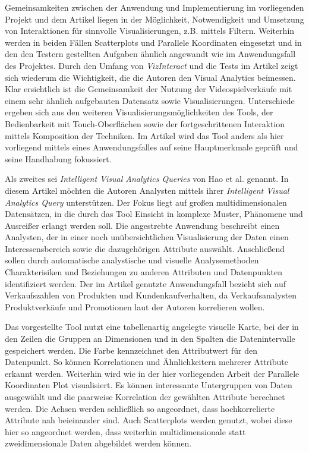 \documentclass[usegeometry=true]{scrartcl}
\begin{document}
Gemeinsamkeiten zwischen der Anwendung und Implementierung im vorliegenden Projekt und dem Artikel liegen in der Möglichkeit, Notwendigkeit und Umsetzung von Interaktionen für sinnvolle Visualisierungen, z.B. mittels Filtern.
Weiterhin werden in beiden Fällen Scatterplots und Parallele Koordinaten eingesetzt und in den den Testern gestellten Aufgaben ähnlich angewandt wie im Anwendungsfall des Projektes. 
Durch den Umfang von \textit{VizInteract} und die Tests im Artikel zeigt sich wiederum die Wichtigkeit, die die Autoren den Visual Analytics beimessen.
Klar ersichtlich ist die Gemeinsamkeit der Nutzung der Videospielverkäufe mit einem sehr ähnlich aufgebauten Datensatz sowie Visualisierungen.
Unterschiede ergeben sich aus den weiteren Visualisierungsmöglichkeiten des Tools, der Bedienbarkeit mit Touch-Oberflächen sowie der fortgeschrittenen Interaktion mittels Komposition der Techniken. 
Im Artikel wird das Tool anders als hier vorliegend mittels eines Anwendungsfalles auf seine Hauptmerkmale geprüft und seine Handhabung fokussiert.

Als zweites sei \textit{Intelligent Visual Analytics Queries} von Hao et al. genannt.\cite{Hao.2007}
In diesem Artikel möchten die Autoren Analysten mittels ihrer \textit{Intelligent Visual Analytics Query} unterstützen.
Der Fokus liegt auf großen multidimensionalen Datensätzen, in die durch das Tool Einsicht in komplexe Muster, Phänomene und Ausreißer erlangt werden soll.
Die angestrebte Anwendung beschreibt einen Analysten, der in einer noch unübersichtlichen Visualisierung der Daten einen Interessensbereich sowie die dazugehörigen Attribute auswählt.
Anschließend sollen durch automatische analystische und visuelle Analysemethoden Charakterisiken und Beziehungen zu anderen Attributen und Datenpunkten identifiziert werden.
Der im Artikel genutzte Anwendungsfall bezieht sich auf Verkaufszahlen von Produkten und Kundenkaufverhalten, da Verkaufsanalysten Produktverkäufe und Promotionen laut der Autoren korrelieren wollen. 

Das vorgestellte Tool nutzt eine tabellenartig angelegte visuelle Karte, bei der in den Zeilen die Gruppen an Dimensionen und in den Spalten die Datenintervalle gespeichert werden.
Die Farbe kennzeichnet den Attributwert für den Datenpunkt. So können Korrelationen und Ähnlichkeitern mehrerer Attribute erkannt werden.
Weiterhin wird wie in der hier vorliegenden Arbeit der Parallele Koordinaten Plot visualisiert. 
Es können interessante Untergruppen von Daten ausgewählt und die paarweise Korrelation der gewählten Attribute berechnet werden. 
Die Achsen werden schließlich so angeordnet, dass hochkorrelierte Attribute nah beieinander sind. 
Auch Scatterplots werden genutzt, wobei diese hier so angeordnet werden, dass weiterhin multidimensionale statt zweidimensionale Daten abgebildet werden können.
\end{document}
